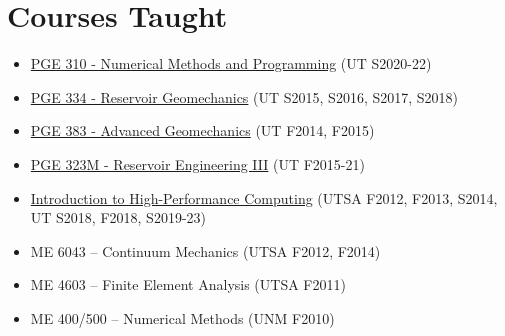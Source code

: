 \section*{Courses Taught}

  \begin{itemize}
      \item \href{https://johnfoster.pge.utexas.edu/PGE310-IntroProgramming/}{PGE 310 - Numerical Methods and Programming} (UT S2020-22)
      \item \href{http://johnfoster.pge.utexas.edu/PGE334-ResGeomechanics/}{PGE 334 - Reservoir Geomechanics} (UT S2015, S2016, S2017, S2018)
      \item \href{http://johnfoster.pge.utexas.edu/PGE383-AdvGeomechanics/}{PGE 383 - Advanced Geomechanics} (UT F2014, F2015)
      \item \href{http://johnfoster.pge.utexas.edu/PGE323M-ResEngineeringIII/}{PGE 323M - Reservoir Engineering III} (UT F2015-21)
      \item \href{http://johnfoster.pge.utexas.edu/HPC/}{Introduction to High-Performance Computing} (UTSA F2012, F2013, S2014, UT S2018, F2018, S2019-23)
      \item ME 6043 -- Continuum Mechanics (UTSA F2012, F2014)
      \item ME 4603 -- Finite Element Analysis (UTSA F2011)
      \item ME 400/500 -- Numerical Methods (UNM F2010)
  \end{itemize}
